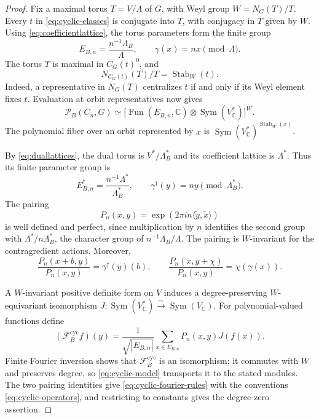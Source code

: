\documentclass[11pt,a4paper,reqno]{amsart}
\theoremstyle{plain}
\theoremstyle{definition}
\theoremstyle{remark}
\numberwithin{equation}{section}
\DeclareMathOperator{\Sym}{Sym}
\DeclareMathOperator{\Stab}{Stab}
\newcommand{\CC}{\mathbb C}
\newcommand{\cP}{\mathcal P}
\newcommand{\pair}[2]{\langle #1,#2\rangle}
\DeclareMathOperator{\Fun}{Fun}
\newcommand{\eexp}[1]{\exp(2\pi i #1)}
\begin{document}
\begin{proof}
Fix a maximal torus $T=V/\Lambda$ of $G$, with Weyl group $W=N_G(T)/T$. Every $t$ in \eqref{eq:cyclic-classes} is conjugate into $T$, with conjugacy in $T$ given by $W$. Using \eqref{eq:coefficientlattice}, the torus parameters form the finite group
\[
E_{B,n}=\frac{n^{-1}\Lambda_B}{\Lambda},\qquad
\gamma(x)=nx\pmod\Lambda.
\]
The torus $T$ is maximal in $C_G(t)^0$, and
\[
N_{C_G(t)}(T)/T=\Stab_W(t).
\]
Indeed, a representative in $N_G(T)$ centralizes $t$ if and only if its Weyl element fixes $t$. Evaluation at orbit representatives now gives
\begin{equation}\label{eq:cyclic-model}
\cP_B(C_n,G)\simeq
\bigl[\Fun(E_{B,n},\CC)\otimes\Sym(V_{\CC}^*)\bigr]^W.
\end{equation}
The polynomial fiber over an orbit represented by $x$ is $\Sym(V_{\CC}^*)^{\Stab_W(x)}$.

By \eqref{eq:duallattices}, the dual torus is $V^*/\Lambda_B^*$ and its coefficient lattice is $\Lambda^*$. Thus its finite parameter group is
\[
E_{B,n}^\dagger=\frac{n^{-1}\Lambda^*}{\Lambda_B^*},\qquad
\gamma^\dagger(y)=ny\pmod{\Lambda_B^*}.
\]
The pairing
\begin{equation}\label{eq:cyclic-pairing}
P_n(x,y)=\eexp{n\pair{\widetilde y}{\widetilde x}}
\end{equation}
is well defined and perfect, since multiplication by $n$ identifies the second group with $\Lambda^*/n\Lambda_B^*$, the character group of $n^{-1}\Lambda_B/\Lambda$. The pairing is $W$-invariant for the contragredient actions. Moreover,
\[
\frac{P_n(x+b,y)}{P_n(x,y)}=\gamma^\dagger(y)(b),\qquad
\frac{P_n(x,y+\chi)}{P_n(x,y)}=\chi(\gamma(x)).
\]

A $W$-invariant positive definite form on $V$ induces a degree-preserving $W$-equivariant isomorphism $J\colon\Sym(V_{\CC}^*)\xrightarrow{\sim}\Sym(V_{\CC})$. For polynomial-valued functions define
\[
(\mathcal F^{\mathrm{cyc}}_Bf)(y)=
\frac{1}{\sqrt{|E_{B,n}|}}\sum_{x\in E_{B,n}}P_n(x,y)J(f(x)).
\]
Finite Fourier inversion shows that $\mathcal F^{\mathrm{cyc}}_B$ is an isomorphism; it commutes with $W$ and preserves degree, so \eqref{eq:cyclic-model} transports it to the stated modules. The two pairing identities give \eqref{eq:cyclic-fourier-rules} with the conventions \eqref{eq:cyclic-operators}, and restricting to constants gives the degree-zero assertion.
\end{proof}
\end{document}
